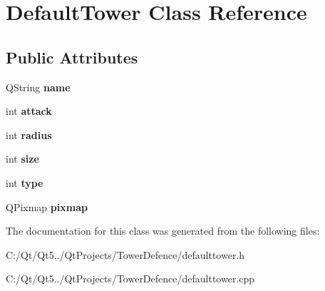 \hypertarget{class_default_tower}{}\section{Default\+Tower Class Reference}
\label{class_default_tower}
\subsection*{Public Attributes}
\begin{DoxyCompactItemize}
\item 
\hypertarget{class_default_tower_a11bbb712b12687310c266fdfb632be35}{}Q\+String {\bfseries name}\label{class_default_tower_a11bbb712b12687310c266fdfb632be35}

\item 
\hypertarget{class_default_tower_a7766f66e74c5ce2758f50a8ad5dbefd6}{}int {\bfseries attack}\label{class_default_tower_a7766f66e74c5ce2758f50a8ad5dbefd6}

\item 
\hypertarget{class_default_tower_a8762f71e9fba10e9c022e3534f54c7c6}{}int {\bfseries radius}\label{class_default_tower_a8762f71e9fba10e9c022e3534f54c7c6}

\item 
\hypertarget{class_default_tower_ab39119f984675bdda969fb232c929c96}{}int {\bfseries size}\label{class_default_tower_ab39119f984675bdda969fb232c929c96}

\item 
\hypertarget{class_default_tower_aa7674a3323ee0373c08c34980ef2a2ce}{}int {\bfseries type}\label{class_default_tower_aa7674a3323ee0373c08c34980ef2a2ce}

\item 
\hypertarget{class_default_tower_a2e032c8a0101a9e7472b6d9b2fc83343}{}Q\+Pixmap {\bfseries pixmap}\label{class_default_tower_a2e032c8a0101a9e7472b6d9b2fc83343}

\end{DoxyCompactItemize}


The documentation for this class was generated from the following files\+:\begin{DoxyCompactItemize}
\item 
C\+:/\+Qt/\+Qt5../\+Qt\+Projects/\+Tower\+Defence/defaulttower.\+h\item 
C\+:/\+Qt/\+Qt5../\+Qt\+Projects/\+Tower\+Defence/defaulttower.\+cpp\end{DoxyCompactItemize}
